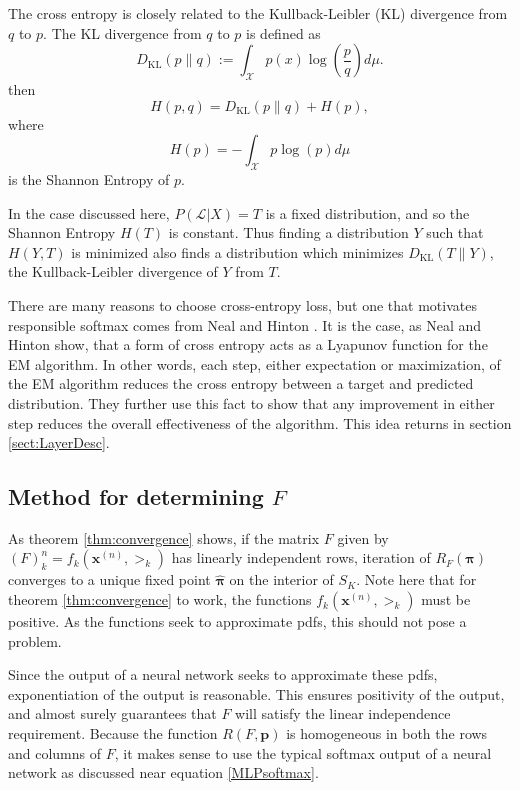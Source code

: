 The cross entropy is closely related to the Kullback-Leibler (KL) divergence from $q$ to $p$.
The KL divergence  from $q$ to $p$ is defined as
\begin{equation}\label{eqn:kldiverge}
D_{\text{KL}}(p\parallel q):=\int_{\mathcal{X}}p(x)\log\left(\dfrac{p}{q}\right)d\mu.
\end{equation}
then  
\begin{equation}\label{eqn:crossentdiverge}
H(p,q)= D_{\text{KL}}(p\parallel q)+H(p),
\end{equation}
where 
\begin{equation}\label{eqn:shannonent}
H(p) = -\int_{\mathcal{X}}p\log(p)d\mu
\end{equation}
is the Shannon Entropy of $p$.

In the case discussed here, $P(\mathcal{L}|X)=T$ is a fixed distribution, and so the
Shannon Entropy $H(T)$ is constant.  Thus finding a distribution $Y$ such that 
$H(Y,T)$ is minimized also finds a distribution which minimizes \( D_{\text{KL}}(T\parallel Y) \), the Kullback-Leibler divergence of $Y$ from $T$.


There are many reasons to choose cross-entropy loss, but one that motivates responsible softmax
comes from Neal and Hinton \cite{NealHintonEM1999}.  It is the case, as Neal and Hinton show, that a form
of cross entropy acts as a Lyapunov function for the EM algorithm. In other words, each
step, either expectation or maximization, of the EM algorithm reduces the cross entropy 
between a target and predicted distribution.  They further use this fact to show that any 
improvement in either step reduces the overall effectiveness of the algorithm. This idea returns in section \ref{sect:LayerDesc}.

\subsection{Method for determining \( F \)}
As theorem \ref{thm:convergence} shows, if the matrix \( F \) given by \((F)_k^n=f_k(\bm x^{(n)},\bm\gt_k)\) has linearly independent rows, iteration of \( R_F(\bm\pi) \) converges to a unique fixed point \( \hat{\bm \pi} \) on the interior of \( S_K \). Note here that for theorem \ref{thm:convergence} to work, the functions \( f_k(\bm x^{(n)},\bm\gt_k) \) must be positive. As the functions seek to approximate pdfs, this should not pose a problem.  

Since the output of a neural network seeks to approximate these pdfs, exponentiation of the output is reasonable.  This ensures positivity of the output, and almost surely guarantees that \( F  \) will satisfy the linear independence requirement.  Because the function \( R(F,\bm p) \) is homogeneous in both the rows and columns of \( F \), it makes sense to use the typical softmax output of a neural network as discussed near equation \ref{MLPsoftmax}.


